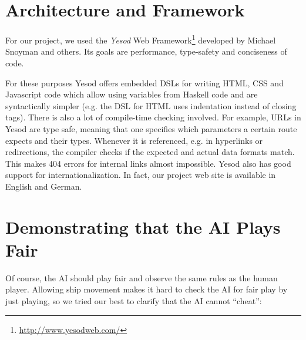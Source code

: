 \documentclass[a4paper]{easychair}
\begin{document}
\section{Architecture and Framework}

For our project, we used the \emph{Yesod} Web Framework\footnote{\url{http://www.yesodweb.com/}} developed by Michael Snoyman and others. Its goals are performance, type-safety and conciseness of code.

For these purposes Yesod offers embedded DSLs for writing HTML, CSS and Javascript code which allow using variables from Haskell code and are syntactically simpler (e.g. the DSL for HTML uses indentation instead of closing tags). There is also a lot of compile-time checking involved. For example, URLs in Yesod are type safe, meaning that one specifies which parameters a certain route expects and their types. Whenever it is referenced, e.g. in hyperlinks or redirections, the compiler checks if the expected and actual data formats match. This makes 404 errors for internal links almost impossible. Yesod also has good support for internationalization. In fact, our project web site is available in English and German.

\section{Demonstrating that the AI Plays Fair}
\label{sect:fair-play}
Of course, the AI should play fair and observe the same rules as the human player. Allowing ship movement makes it hard to check the AI for fair play by just playing, so we tried our best to clarify that the AI cannot ``cheat'':
\end{document}
